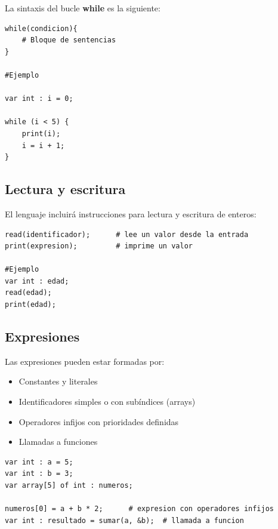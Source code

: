 \documentclass[12pt,a4paper]{article}
\begin{document}
La sintaxis del bucle \textbf{while} es la siguiente:

\begin{lstlisting}
while(condicion){
    # Bloque de sentencias
}

#Ejemplo

var int : i = 0;

while (i < 5) {
    print(i);
    i = i + 1;
}
\end{lstlisting}

\subsection{Lectura y escritura}

El lenguaje incluirá instrucciones para lectura y escritura de enteros:

\begin{lstlisting}
read(identificador);      # lee un valor desde la entrada
print(expresion);         # imprime un valor

#Ejemplo
var int : edad;
read(edad);
print(edad);
\end{lstlisting}



\subsection{Expresiones}

Las expresiones pueden estar formadas por:

\begin{itemize}
    \item Constantes y literales
    \item Identificadores simples o con subíndices (arrays)
    \item Operadores infijos con prioridades definidas
    \item Llamadas a funciones
\end{itemize}


\begin{lstlisting}
var int : a = 5;
var int : b = 3;
var array[5] of int : numeros;

numeros[0] = a + b * 2;      # expresion con operadores infijos
var int : resultado = sumar(a, &b);  # llamada a funcion
\end{lstlisting}

\end{document}
